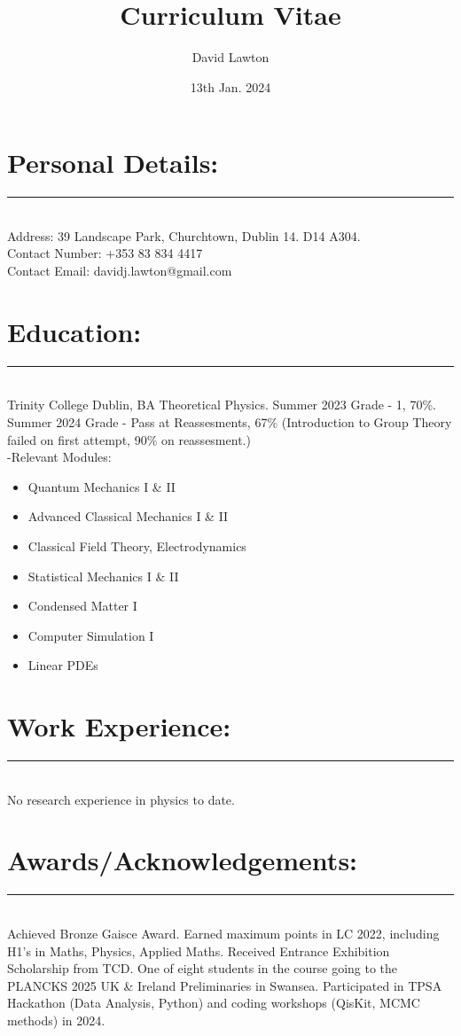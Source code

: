 \documentclass{article}
\title{Curriculum Vitae}
\author{David Lawton}
\date{13th Jan. 2024}
\begin{document}
\maketitle
\vfill

\section*{Personal Details:}
\hrule~\\
Address: 39 Landscape Park, Churchtown, Dublin 14. D14 A304.\\
Contact Number: +353 83 834 4417\\
Contact Email: davidj.lawton@gmail.com\\

\section*{Education:}
\hrule~\\
Trinity College Dublin, BA Theoretical Physics. Summer 2023 Grade - 1, 70\%. Summer 2024 Grade - Pass at Reassesments, 67\% (Introduction to Group Theory failed on first attempt, 90\% on reassesment.)\\
-Relevant Modules:
\begin{itemize}
\item Quantum Mechanics I \& II
\item Advanced Classical Mechanics I \& II
\item Classical Field Theory, Electrodynamics
\item Statistical Mechanics I \& II
\item Condensed Matter I
\item Computer Simulation I
\item Linear PDEs
\end{itemize}

\section*{Work Experience:}
\hrule~\\
No research experience in physics to date. 
\section*{Awards/Acknowledgements:}
\hrule~\\
Achieved Bronze Gaisce Award. Earned maximum points in LC 2022, including H1's in Maths, Physics, Applied Maths. Received Entrance Exhibition Scholarship from TCD. One of eight students in the course going to the PLANCKS 2025 UK \& Ireland Preliminaries in Swansea. Participated in TPSA Hackathon (Data Analysis, Python) and coding workshops (QisKit, MCMC methods) in 2024.
\end{document}
